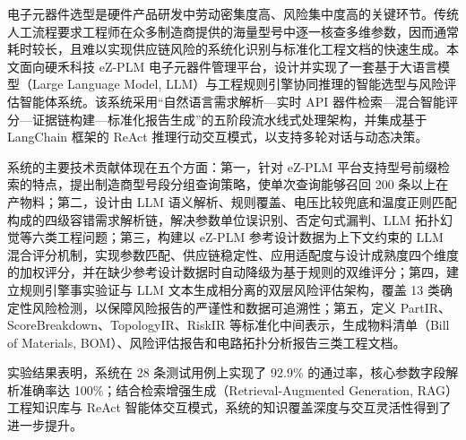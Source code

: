 电子元器件选型是硬件产品研发中劳动密集度高、风险集中度高的关键环节。传统人工流程要求工程师在众多制造商提供的海量型号中逐一核查多维参数，因而通常耗时较长，且难以实现供应链风险的系统化识别与标准化工程文档的快速生成。本文面向硬禾科技 eZ-PLM 电子元器件管理平台，设计并实现了一套基于大语言模型（Large Language Model, LLM）与工程规则引擎协同推理的智能选型与风险评估智能体系统。该系统采用“自然语言需求解析—实时 API 器件检索—混合智能评分—证据链构建—标准化报告生成”的五阶段流水线式处理架构，并集成基于 LangChain 框架的 ReAct 推理行动交互模式，以支持多轮对话与动态决策。

系统的主要技术贡献体现在五个方面：第一，针对 eZ-PLM 平台支持型号前缀检索的特点，提出制造商型号段分组查询策略，使单次查询能够召回 200 条以上在产物料；第二，设计由 LLM 语义解析、规则覆盖、电压比较兜底和温度正则匹配构成的四级容错需求解析链，解决参数单位误识别、否定句式漏判、LLM 拓扑幻觉等六类工程问题；第三，构建以 eZ-PLM 参考设计数据为上下文约束的 LLM 混合评分机制，实现参数匹配、供应链稳定性、应用适配度与设计成熟度四个维度的加权评分，并在缺少参考设计数据时自动降级为基于规则的双维评分；第四，建立规则引擎事实验证与 LLM 文本生成相分离的双层风险评估架构，覆盖 13 类确定性风险检测，以保障风险报告的严谨性和数据可追溯性；第五，定义 PartIR、ScoreBreakdown、TopologyIR、RiskIR 等标准化中间表示，生成物料清单（Bill of Materials, BOM）、风险评估报告和电路拓扑分析报告三类工程文档。

实验结果表明，系统在 28 条测试用例上实现了 92.9\% 的通过率，核心参数字段解析准确率达 100\%；结合检索增强生成（Retrieval-Augmented Generation, RAG）工程知识库与 ReAct 智能体交互模式，系统的知识覆盖深度与交互灵活性得到了进一步提升。

